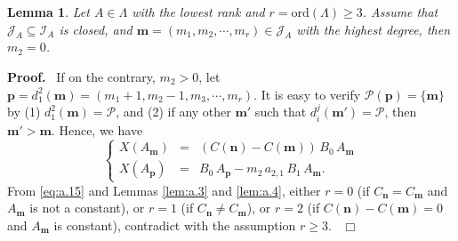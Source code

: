 \documentclass[preprint, 12pt]{elsarticle}
\newtheorem{lem}[thm]{Lemma}
\numberwithin{equation}{section}
\newenvironment{proof}[1][Proof]{\textbf{#1.}\ }{\ $\Box$}
\begin{document}
\begin{lem}
\label{lem:a.11}Let $A\in \Lambda$ with the lowest rank and $r =
\mathrm{ord}(\Lambda) \geq 3$. Assume that $\mathcal{J}_A\subseteq \mathcal{I}_A$ is
closed, and $\mathbf{m} = (m_1,m_2,\cdots,m_r)\in \mathcal{J}_A$ with the
highest degree, then $m_2 = 0$.
\end{lem}
\begin{proof}
If on the contrary, $m_2>0$, let $\mathbf{p} = d_1^2(\mathbf{m}) =
(m_1+1,m_2-1,m_3,\cdots,m_r)$. It is easy to verify 
$\mathcal{P}(\mathbf{p}) = \{\mathbf{m}\}$ by (1) $d_1^2(\mathbf{m}) = \mathcal{P}$,
and (2) if any other $\mathbf{m'}$ such that $d_i^j(\mathbf{m'})
=\mathcal{P}$, then $\mathbf{m'} > \mathbf{m}$. Hence, we have
\begin{equation}
\label{eq:a.15} \left\{
\begin{array}{rcl}
X(A_{\mathbf{m}}) &=& (C(\mathbf{n}) - C(\mathbf{m}))\,B_0\,A_{\mathbf{m}}\\
X(A_{\mathbf{p}}) &=& B_0\,A_{\mathbf{p}} - m_2\,a_{2,1}\,
B_1\,A_{\mathbf{m}}.
\end{array}\right.
\end{equation}
From \eqref{eq:a.15} and Lemmas \ref{lem:a.3} and
\ref{lem:a.4}, either $r = 0$ (if $C_{\mathbf{n}} =
C_{\mathbf{m}}$ and $A_{\mathbf{m}}$ is not a constant), or $r = 1$
(if $C_{\mathbf{n}} \not= C_{\mathbf{m}}$), or $r = 2$ (if
$C(\mathbf{n}) - C(\mathbf{m}) = 0$ and $A_{\mathbf{m}}$ is
constant), contradict with the assumption $r\geq 3$.
\end{proof}
\end{document}

